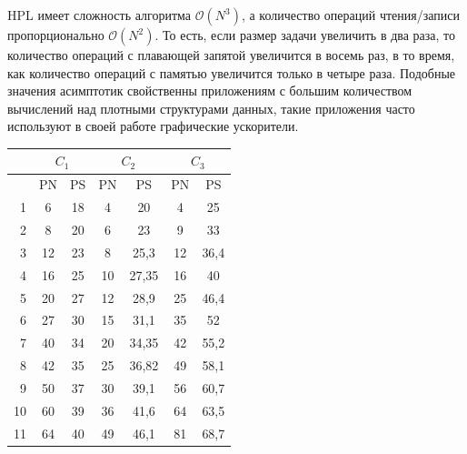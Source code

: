 	HPL имеет сложность алгоритма \(\mathcal{O}(N^3)\), а количество операций чтения/записи пропорционально \(\mathcal{O}(N^2)\). То есть, если размер задачи увеличить в два раза, то количество операций с плавающей запятой увеличится в восемь раз, в то время, как количество операций с памятью увеличится только в четыре раза. Подобные значения асимптотик свойственны приложениям с большим количеством вычислений над плотными структурами данных, такие приложения часто используют в своей работе графические ускорители.

	\begin{table}
		\centering
		\begin{tabular}{|r||c|c||c|c||c|c|}
			\hline
			            & \multicolumn{2}{c|}{\(C_1\)} & \multicolumn{2}{c|}{\(C_2\)} & \multicolumn{2}{c|}{\(C_3\)} \\ \hline
			\textnumero &  PN &                     PS &  PN &                     PS &  PN & PS                     \\ \hline
			1           &   6 &                     18 &   4 &                     20 &   4 & 25                     \\ \hline
			2           &   8 &                     20 &   6 &                     23 &   9 & 33                     \\ \hline
			3           &  12 &                     23 &   8 &                   25,3 &  12 & 36,4                   \\ \hline
			4           &  16 &                     25 &  10 &                  27,35 &  16 & 40 					 \\ \hline
			5           &  20 &                     27 &  12 &                   28,9 &  25 & 46,4 					 \\ \hline
			6           &  27 &                     30 &  15 &                   31,1 &  35 & 52 					 \\ \hline
			7           &  40 &                     34 &  20 &                  34,35 &  42 & 55,2 					 \\ \hline
			8           &  42 &                     35 &  25 &                  36,82 &  49 & 58,1                   \\ \hline
			9           &  50 &                     37 &  30 &                   39,1 &  56 & 60,7                   \\ \hline
			10          &  60 &                     39 &  36 &                   41,6 &  64 & 63,5                   \\ \hline
			11          &  64 &                     40 &  49 &                   46,1 &  81 & 68,7                   \\ \hline

\end{tabular}
\end{table}
